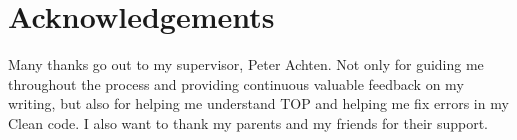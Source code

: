 \chapter*{Acknowledgements}
Many thanks go out to my supervisor, Peter Achten. Not only for guiding me throughout the process and providing continuous valuable feedback on my writing, but also for helping me understand TOP and helping me fix errors in my Clean code.
I also want to thank my parents and my friends for their support.
